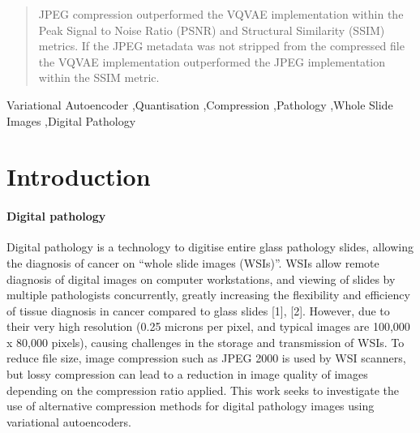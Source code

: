 \documentclass[review]{elsarticle}
\begin{document}
\begin{frontmatter}
\begin{abstract}
JPEG compression outperformed the VQVAE implementation within the Peak Signal to Noise Ratio (PSNR) and Structural Similarity (SSIM) metrics. If the JPEG metadata was not stripped from the compressed file the VQVAE implementation outperformed the JPEG implementation within the SSIM metric.

\end{abstract}

\begin{keyword}
 Variational Autoencoder \sep Quantisation \sep Compression \sep Pathology \sep Whole Slide Images \sep Digital Pathology
\end{keyword}

\end{frontmatter}

\linenumbers

\section{Introduction}
\paragraph{Digital pathology} Digital pathology is a technology to digitise entire glass pathology slides, allowing the diagnosis of cancer on ``whole slide images (WSIs)''. WSIs allow remote diagnosis of digital images on computer workstations, and viewing of slides by multiple pathologists concurrently, greatly increasing the flexibility and efficiency of tissue diagnosis in cancer compared to glass slides [1], [2]. However, due to their very high resolution (0.25 microns per pixel, and typical images are 100,000 x 80,000 pixels), causing challenges in the storage and transmission of WSIs. To reduce file size, image compression such as JPEG 2000 is used by WSI scanners, but lossy compression can lead to a reduction in image quality of images depending on the compression ratio applied. This work seeks to investigate the use of alternative compression methods for digital pathology images using variational autoencoders.
\end{document}
